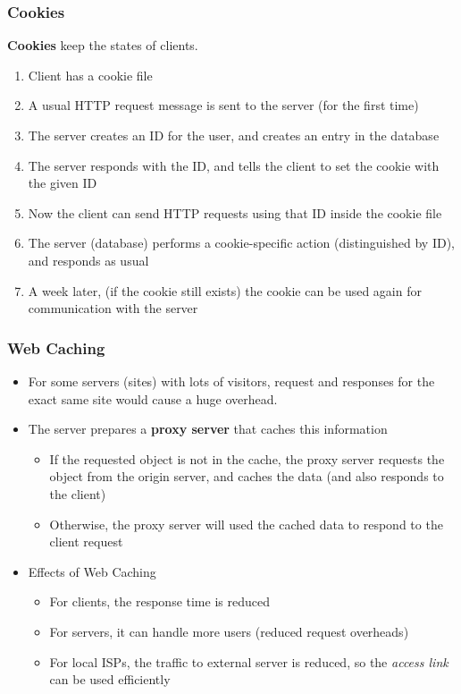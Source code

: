 \subsubsection{Cookies}
\textbf{Cookies} keep the states of clients.
\begin{enumerate}
	\item Client has a cookie file
	\item A usual HTTP request message is sent to the server (for the first time)
	\item The server creates an ID for the user, and creates an entry in the database
	\item The server responds with the ID, and tells the client to set the cookie with the given ID
	\item Now the client can send HTTP requests using that ID inside the cookie file
	\item The server (database) performs a cookie-specific action (distinguished by ID), and responds as usual
	\item A week later, (if the cookie still exists) the cookie can be used again for communication with the server
\end{enumerate}

\subsubsection{Web Caching}
\begin{itemize}
	\item For some servers (sites) with lots of visitors, request and responses for the exact same site would cause a huge overhead.
	\item The server prepares a \textbf{proxy server} that caches this information
	\begin{itemize}
		\item If the requested object is not in the cache, the proxy server requests the object from the origin server, and caches the data (and also responds to the client)
		\item Otherwise, the proxy server will used the cached data to respond to the client request
	\end{itemize}
	\item Effects of Web Caching
	\begin{itemize}
		\item For clients, the response time is reduced
		\item For servers, it can handle more users (reduced request overheads)
		\item For local ISPs, the traffic to external server is reduced, so the \textit{access link} can be used efficiently
	\end{itemize}
\end{itemize}

